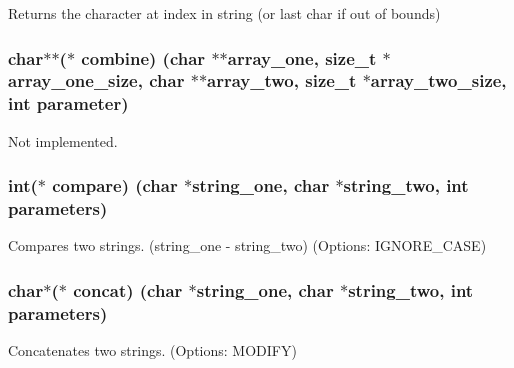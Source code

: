 Returns the character at index in string (or last char if out of bounds) 

\hypertarget{struct_string___utils_a74a8e43b4ec773c1127882608bc1988a}{}
\subsubsection[{combine}]{\setlength{\rightskip}{0pt plus 5cm}char$\ast$$\ast$($\ast$ combine) (char $\ast$$\ast$array\+\_\+one, size\+\_\+t $\ast$array\+\_\+one\+\_\+size, char $\ast$$\ast$array\+\_\+two, size\+\_\+t $\ast$array\+\_\+two\+\_\+size, int parameter)}\label{struct_string___utils_a74a8e43b4ec773c1127882608bc1988a}


Not implemented. 

\hypertarget{struct_string___utils_aa295704dbae3b08709ed3d36fa562843}{}
\subsubsection[{compare}]{\setlength{\rightskip}{0pt plus 5cm}int($\ast$ compare) (char $\ast$string\+\_\+one, char $\ast$string\+\_\+two, int parameters)}\label{struct_string___utils_aa295704dbae3b08709ed3d36fa562843}


Compares two strings. (string\+\_\+one -\/ string\+\_\+two) (Options\+: I\+G\+N\+O\+R\+E\+\_\+\+C\+A\+S\+E) 

\hypertarget{struct_string___utils_ae83461b87a5dd02592e517a2cb22b37d}{}
\subsubsection[{concat}]{\setlength{\rightskip}{0pt plus 5cm}char$\ast$($\ast$ concat) (char $\ast$string\+\_\+one, char $\ast$string\+\_\+two, int parameters)}\label{struct_string___utils_ae83461b87a5dd02592e517a2cb22b37d}


Concatenates two strings. (Options\+: M\+O\+D\+I\+F\+Y) 

\hypertarget{struct_string___utils_a490b7ad14aa39447ea1e261b3f5398fa}{}
